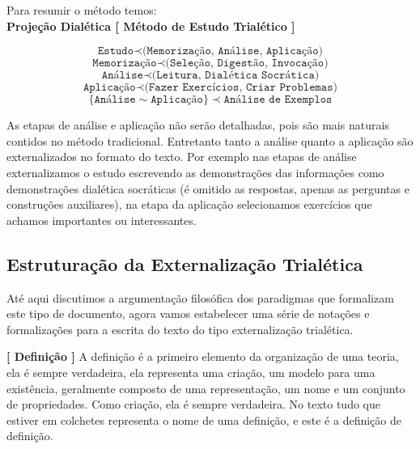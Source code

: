 \documentclass[10pt,a4paper]{report}
\begin{document}
Para resumir o método temos:\\

\textbf{Projeção Dialética [ Método de Estudo Trialético ]}

$$ \texttt{Estudo} \prec \texttt{(Memorização, Análise, Aplicação)} $$
$$ \texttt{Memorização} \prec \texttt{(Seleção, Digestão, Invocação)} $$
$$ \texttt{Análise} \prec \texttt{(Leitura, Dialética Socrática)} $$
$$ \texttt{Aplicação} \prec \texttt{(Fazer Exercícios, Criar Problemas)} $$
$$ \{ \texttt{Análise} \sim \texttt{Aplicação} \} \prec \texttt{Análise de Exemplos}$$

As etapas de análise e aplicação não serão detalhadas, pois são mais naturais contidos no método tradicional. Entretanto tanto a análise quanto a aplicação são externalizados no formato do texto. Por exemplo nas etapas de análise externalizamos o estudo escrevendo as demonstrações das informações como demonstrações dialética socráticas (é omitido as respostas, apenas as perguntas e construções auxiliares), na etapa da aplicação selecionamos exercícios que achamos importantes ou interessantes.



\subsection{Estruturação da Externalização Trialética}

\hspace{\baselineskip}

Até aqui discutimos a argumentação filosófica dos paradigmas que formalizam este tipo de documento, agora vamos estabelecer uma série de notações e formalizações para a escrita do texto do tipo externalização trialética.

\hspace{\baselineskip}

\textbf{[ Definição ]} A definição é a primeiro elemento da organização de uma teoria, ela é sempre verdadeira, ela representa uma criação, um modelo para uma existência, geralmente composto de uma representação, um nome e um conjunto de propriedades. Como criação, ela é sempre verdadeira. No texto tudo que estiver em colchetes representa o nome de uma definição, e este é a definição de definição.\\
\end{document}
